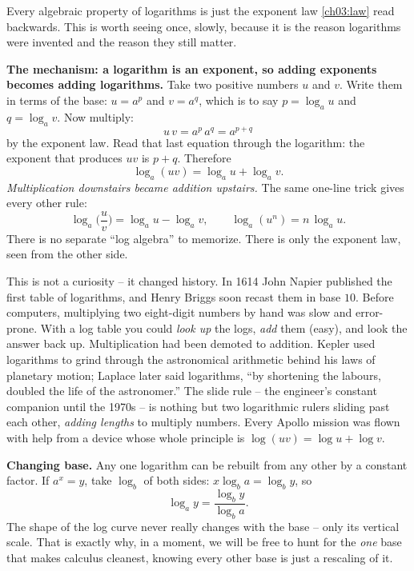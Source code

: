 Every algebraic property of logarithms is just the exponent law \eqref{ch03:law} read backwards. This is worth seeing once, slowly, because it is the reason logarithms were invented and the reason they still matter.

\begin{whybox}
\textbf{The mechanism: a logarithm is an exponent, so adding exponents becomes adding logarithms.} Take two positive numbers $u$ and $v$. Write them in terms of the base: $u = a^p$ and $v = a^q$, which is to say $p=\log_a u$ and $q=\log_a v$. Now multiply:
\[
u\,v = a^p\, a^q = a^{p+q}
\]
by the exponent law. Read that last equation through the logarithm: the exponent that produces $uv$ is $p+q$. Therefore
\[
\boxed{\;\log_a(uv) = \log_a u + \log_a v.\;}
\]
\emph{Multiplication downstairs became addition upstairs.} The same one-line trick gives every other rule:
\[
\log_a\!\Big(\frac{u}{v}\Big) = \log_a u - \log_a v, \qquad \log_a(u^n) = n\,\log_a u.
\]
There is no separate ``log algebra'' to memorize. There is only the exponent law, seen from the other side.
\end{whybox}

\begin{historybox}
This is not a curiosity -- it changed history. In 1614 John Napier published the first table of logarithms, and Henry Briggs soon recast them in base $10$. Before computers, multiplying two eight-digit numbers by hand was slow and error-prone. With a log table you could \emph{look up} the logs, \emph{add} them (easy), and look the answer back up. Multiplication had been demoted to addition. Kepler used logarithms to grind through the astronomical arithmetic behind his laws of planetary motion; Laplace later said logarithms, ``by shortening the labours, doubled the life of the astronomer.'' The slide rule -- the engineer's constant companion until the 1970s -- is nothing but two logarithmic rulers sliding past each other, \emph{adding lengths} to multiply numbers. Every Apollo mission was flown with help from a device whose whole principle is $\log(uv)=\log u+\log v$.
\end{historybox}

\begin{focusbox}
\textbf{Changing base.} Any one logarithm can be rebuilt from any other by a constant factor. If $a^x=y$, take $\log_b$ of both sides: $x\log_b a = \log_b y$, so
\[
\log_a y = \frac{\log_b y}{\log_b a}.
\]
The shape of the log curve never really changes with the base -- only its vertical scale. That is exactly why, in a moment, we will be free to hunt for the \emph{one} base that makes calculus cleanest, knowing every other base is just a rescaling of it.
\end{focusbox}

